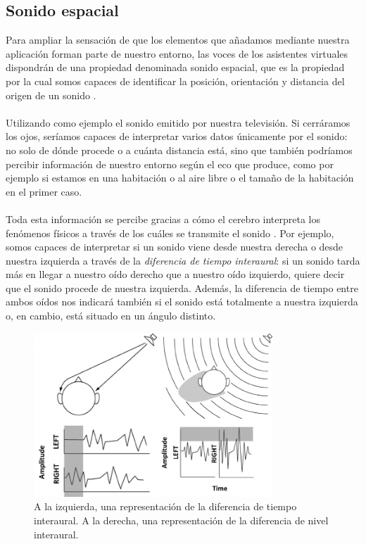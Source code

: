 \documentclass{subfiles}
\begin{document}
        \subsection{Sonido espacial}
        \label{sec:1.4.3}
        Para ampliar la sensación de que los elementos que añadamos mediante nuestra aplicación forman parte de nuestro entorno, las voces de los asistentes virtuales dispondrán de una propiedad denominada sonido espacial, que es la propiedad por la cual somos capaces de identificar la posición, orientación y distancia del origen de un sonido \cite{web:wikipedia_localizacion_sonido}.

        \paragraph{}
        Utilizando como ejemplo el sonido emitido por nuestra televisión. Si cerráramos los ojos, seríamos capaces de interpretar varios datos únicamente por el sonido: no solo de dónde procede o a cuánta distancia está, sino que también podríamos percibir información de nuestro entorno según el eco que produce, como por ejemplo si estamos en una habitación o al aire libre o el tamaño de la habitación en el primer caso.

        \paragraph{}
        Toda esta información se percibe gracias a cómo el cerebro interpreta los fenómenos físicos a través de los cuáles se transmite el sonido \cite{web:resonance_audio_localizacion_sonido, web:wikipedia_localizacion_sonido}. Por ejemplo, somos capaces de interpretar si un sonido viene desde nuestra derecha o desde nuestra izquierda a través de la \textit{diferencia de tiempo interaural}: si un sonido tarda más en llegar a nuestro oído derecho que a nuestro oído izquierdo, quiere decir que el sonido procede de nuestra izquierda. Además, la diferencia de tiempo entre ambos oídos nos indicará también si el sonido está totalmente a nuestra izquierda o, en cambio, está situado en un ángulo distinto.

        \begin{figure}
        \centering
        \includegraphics[width=0.8\textwidth]{img/ITD_ILD.png}
        \caption{A la izquierda, una representación de la diferencia de tiempo interaural. A la derecha, una representación de la diferencia de nivel interaural.}
        \label{fig:ITD_ILD}
        \end{figure}
\end{document}
